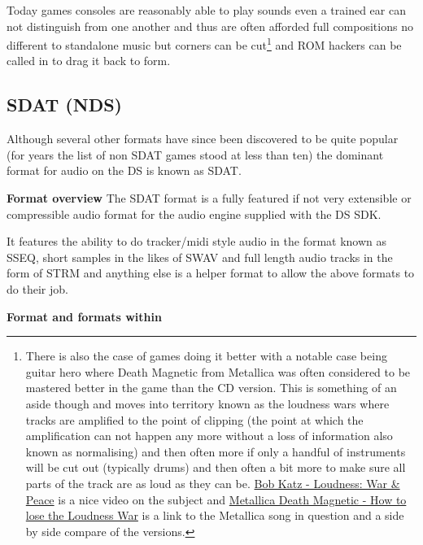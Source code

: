 \documentclass[
]{book}
\begin{document}
Today games consoles are reasonably able to play sounds even a trained ear can not distinguish from one another and thus are often afforded full compositions no different to standalone music but corners can be cut\footnote{There is also the case of games doing it better with a notable case being guitar hero where Death Magnetic from Metallica was often considered to be mastered better in the game than the CD version. This is something of an aside though and moves into territory known as the loudness wars where tracks are amplified to the point of clipping (the point at which the amplification can not happen any more without a loss of information also known as normalising) and then often more if only a handful of instruments will be cut out (typically drums) and then often a bit more to make sure all parts of the track are as loud as they can be. \href{http://www.youtube.com/watch?\&v=u9Fb3rWNWDA}{Bob Katz - Loudness: War \& Peace} is a nice video on the subject and \href{http://www.youtube.com/watch?\&v=DRyIACDCc1I}{Metallica Death Magnetic - How to lose the Loudness War} is a link to the Metallica song in question and a side by side compare of the versions.} and ROM hackers can be called in to drag it back to form.

\hypertarget{sdat-nds}{%
\subsection{SDAT (NDS)}\label{sdat-nds}}

Although several other formats have since been discovered to be quite popular (for years the list of non SDAT games stood at less than ten) the dominant format for audio on the DS is known as SDAT.

\textbf{Format overview} The SDAT format is a fully featured if not very extensible or compressible audio format for the audio engine supplied with the DS SDK.

It features the ability to do tracker/midi style audio in the format known as SSEQ, short samples in the likes of SWAV and full length audio tracks in the form of STRM and anything else is a helper format to allow the above formats to do their job.

\textbf{Format and formats within}
\end{document}
